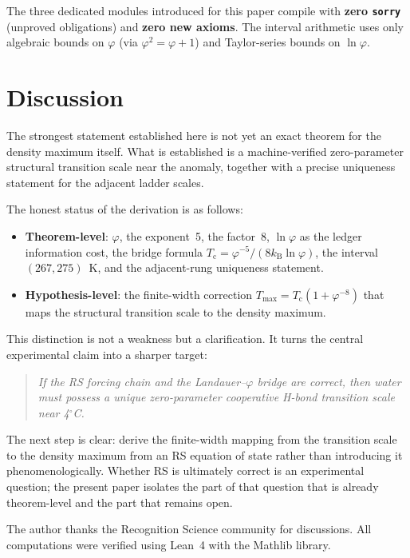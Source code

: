 \documentclass[aps,prl,twocolumn,superscriptaddress,showpacs,floatfix]{revtex4-2}
\newcommand{\kB}{k_{\mathrm{B}}}
\newcommand{\Tc}{T_{\mathrm{c}}}
\newcommand{\Tmax}{T_{\mathrm{max}}}
\newcommand{\phig}{\varphi}
\begin{document}
The three dedicated modules introduced for this paper compile with \textbf{zero \texttt{sorry}} (unproved obligations) and \textbf{zero new axioms}. The interval arithmetic uses only algebraic bounds on $\phig$ (via $\phig^2 = \phig + 1$) and Taylor-series bounds on $\ln\phig$.

\section{Discussion}

The strongest statement established here is not yet an exact theorem for the density maximum itself.
What is established is a machine-verified zero-parameter structural transition scale near the anomaly, together with a precise uniqueness statement for the adjacent ladder scales.

The honest status of the derivation is as follows:
\begin{itemize}
\item \textbf{Theorem-level}: $\phig$, the exponent~5, the factor~8, $\ln\phig$ as the ledger information cost, the bridge formula $\Tc = \phig^{-5}/(8\kB\ln\phig)$, the interval $(267,275)$~K, and the adjacent-rung uniqueness statement.
\item \textbf{Hypothesis-level}: the finite-width correction $\Tmax=\Tc(1+\phig^{-8})$ that maps the structural transition scale to the density maximum.
\end{itemize}

This distinction is not a weakness but a clarification.
It turns the central experimental claim into a sharper target:
\begin{quote}
\emph{If the RS forcing chain and the Landauer--$\phig$ bridge are correct, then water must possess a unique zero-parameter cooperative H-bond transition scale near 4$^\circ$C.}
\end{quote}
The next step is clear: derive the finite-width mapping from the transition scale to the density maximum from an RS equation of state rather than introducing it phenomenologically.
Whether RS is ultimately correct is an experimental question; the present paper isolates the part of that question that is already theorem-level and the part that remains open.

\begin{acknowledgments}
The author thanks the Recognition Science community for discussions.
All computations were verified using Lean~4 with the Mathlib library.
\end{acknowledgments}
\end{document}
